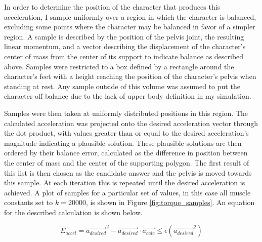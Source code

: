 In order to determine the position of the character that produces this acceleration, I sample uniformly over a region in which the character is balanced, excluding some points where the character may be balanced in favor of a simpler region.   A sample is described by the position of the pelvis joint, the resulting linear momentum, and a vector describing the displacement of the character's center of mass from the center of its support to indicate balance as described above.  Samples were restricted to a box defined by a rectangle around the character's feet with a height reaching the position of the character's pelvis when standing at rest.  Any sample outside of this volume was assumed to put the character off balance due to the lack of upper body definition in my simulation.

Samples were then taken at uniformly distributed positions in this region.  The calculated acceleration was projected onto the desired acceleration vector through the dot product, with values greater than or equal to the desired acceleration's magnitude indicating a plausible solution.  These plausible solutions are then ordered by their balance error, calculated as the difference in position between the center of mass and the center of the supporting polygon.  The first result of this list is then chosen as the candidate answer and the pelvis is moved towards this sample.  At each iteration this is repeated until the desired acceleration is achieved.  A plot of samples for a particular set of values, in this case all muscle constants set to $k=20000$, is shown in Figure \ref{fig:torque_samples}.  An equation for the described calculation is shown below.

\[
	E_{accel} = \vec{a_{desired}}^2 - \vec{a_{desired}} \cdot \vec{a_{calc}} \le \epsilon \left(\vec{a_{desired}}^2\right)
\]

